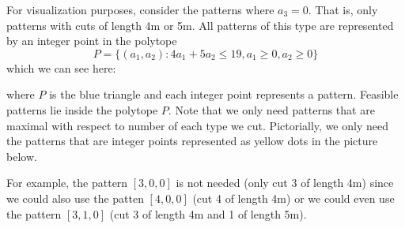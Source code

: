 For visualization purposes, consider the patterns where $a_3 = 0$.  That is, only patterns with cuts of length 4m or 5m.  All patterns of this type are represented by an integer point in the polytope 
\begin{equation}
P = \{(a_1,a_2) : 4a_1 + 5 a_2 \leq 19, a_1\geq 0, a_2 \geq 0\}
\end{equation}
which we can see here:
\begin{center}
\end{center}
where $P$ is the blue triangle and each integer point represents a pattern.  Feasible patterns lie inside the polytope $P$.  Note that we only need patterns that are maximal with respect to number of each type we cut.  Pictorially, we only need the patterns that are integer points represented as yellow dots in the picture below.
\begin{center}
\end{center}
For example, the pattern $[3,0,0]$ is not needed (only cut 3 of length 4m) since we could also use the patten $[4,0,0]$ (cut 4 of  length 4m) or we could even use the pattern $[3,1,0]$  (cut 3 of length 4m and 1 of length 5m).

